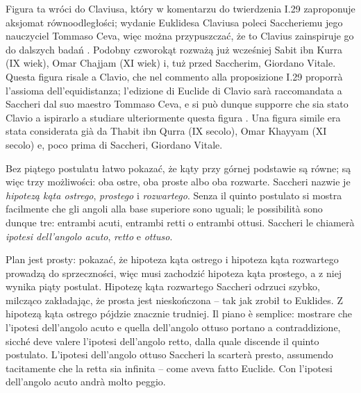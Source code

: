 Figura ta wróci do Claviusa, który w komentarzu do twierdzenia I.29 zaproponuje aksjomat równoodległości; wydanie Euklidesa Claviusa poleci Saccheriemu jego nauczyciel Tommaso Ceva, więc można przypuszczać, że to Clavius zainspiruje go do dalszych badań \cite[s. 306]{hartshorne_2000}. %
Podobny czworokąt rozważą już wcześniej Sabit ibn Kurra (IX wiek), Omar Chajjam (XI wiek) i, tuż przed Saccherim, Giordano Vitale. %
Questa figura risale a Clavio, che nel commento alla proposizione I.29 proporrà l'assioma dell'equidistanza; l'edizione di Euclide di Clavio sarà raccomandata a Saccheri dal suo maestro Tommaso Ceva, e si può dunque supporre che sia stato Clavio a ispirarlo a studiare ulteriormente questa figura \cite[p. 306]{hartshorne_2000}. %
Una figura simile era stata considerata già da Thabit ibn Qurra (IX secolo), Omar Khayyam (XI secolo) e, poco prima di Saccheri, Giordano Vitale. %

Bez piątego postulatu łatwo pokazać, że kąty przy górnej podstawie są równe; są więc trzy możliwości: oba ostre, oba proste albo oba rozwarte. %
Saccheri nazwie je \emph{hipotezą kąta ostrego}, \emph{prostego} i \emph{rozwartego}. %
Senza il quinto postulato si mostra facilmente che gli angoli alla base superiore sono uguali; le possibilità sono dunque tre: entrambi acuti, entrambi retti o entrambi ottusi. %
Saccheri le chiamerà \emph{ipotesi dell'angolo acuto}, \emph{retto} e \emph{ottuso}. %

Plan jest prosty: pokazać, że hipoteza kąta ostrego i hipoteza kąta rozwartego prowadzą do sprzeczności, więc musi zachodzić hipoteza kąta prostego, a z niej wynika piąty postulat. %
Hipotezę kąta rozwartego Saccheri odrzuci szybko, milcząco zakładając, że prosta jest nieskończona -- tak jak zrobił to Euklides. %
Z hipotezą kąta ostrego pójdzie znacznie trudniej. %
Il piano è semplice: mostrare che l'ipotesi dell'angolo acuto e quella dell'angolo ottuso portano a contraddizione, sicché deve valere l'ipotesi dell'angolo retto, dalla quale discende il quinto postulato. %
L'ipotesi dell'angolo ottuso Saccheri la scarterà presto, assumendo tacitamente che la retta sia infinita -- come aveva fatto Euclide. %
Con l'ipotesi dell'angolo acuto andrà molto peggio. %

